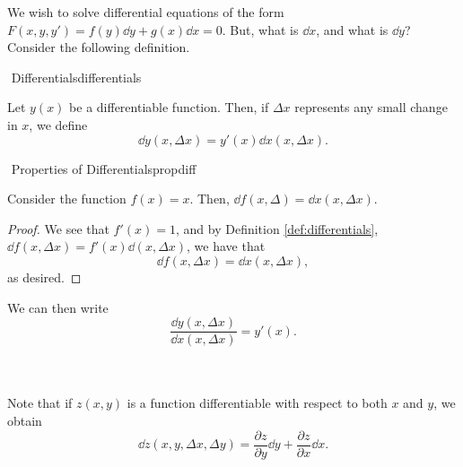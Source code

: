         We wish to solve differential equations of the form \(F(x,y,y')=f(y)\dd y+g(x)\dd x=0\). But, what is \(\dd x\), and what is \(\dd y\)? Consider the following definition.
        \begin{definition}{\Stop\,\,Differentials}{differentials}

            Let \(y(x)\) be a differentiable function. Then, if \(\Delta x\) represents any small change in \(x\), we define
            \begin{equation*}
                \dd y(x,\Delta x)=y'(x)\dd x(x,\Delta x).
            \end{equation*}

        \end{definition}
        \begin{theorem}{\Stop\,\,Properties of Differentials}{propdiff}

            Consider the function \(f(x)=x\). Then, \(\dd f(x,\Delta)=\dd x(x,\Delta x)\).
            \begin{proof}
                We see that \(f'(x)=1\), and by Definition \ref{def:differentials}, \(\dd f(x,\Delta x)=f'(x)\dd(x,\Delta x)\), we have that
                \begin{equation*}
                    \dd f(x,\Delta x)=\dd x(x,\Delta x),
                \end{equation*}
                as desired.
            \end{proof}
            We can then write
            \begin{equation*}
                \frac{\dd y(x,\Delta x)}{\dd x(x,\Delta x)}=y'(x).
            \end{equation*}
            
        \end{theorem}
        \vphantom
        \\
        \\
        Note that if \(z(x,y)\) is a function differentiable with respect to both \(x\) and \(y\), we obtain
        \begin{equation*}
            \dd z(x,y,\Delta x,\Delta y)=\frac{\partial z}{\partial y}\dd y+\frac{\partial z}{\partial x}\dd x.
        \end{equation*}